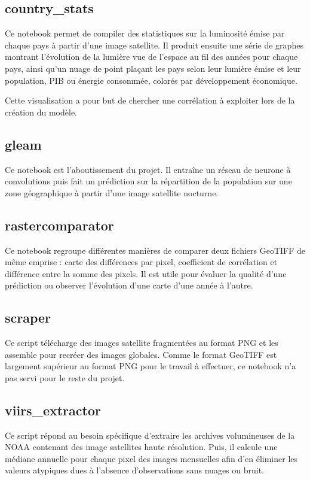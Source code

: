 \documentclass[a4paper, 11pt]{report}
\begin{document}
\subsection{country\_stats}
Ce notebook permet de compiler des statistiques sur la luminosité émise par chaque pays à partir d'une image satellite. Il produit ensuite une série de graphes montrant l'évolution de la lumière vue de l'espace au fil des années pour chaque pays, ainsi qu'un nuage de point plaçant les pays selon leur lumière émise et leur population, PIB ou énergie consommée, colorés par développement économique.

Cette visualisation a pour but de chercher une corrélation à exploiter lors de la création du modèle.

\subsection{gleam}
Ce notebook est l'aboutissement du projet. Il entraîne un réseau de neurone à convolutions puis fait un prédiction sur la répartition de la population sur une zone géographique à partir d'une image satellite nocturne.

\subsection{rastercomparator}
Ce notebook regroupe différentes manières de comparer deux fichiers GeoTIFF de même emprise : carte des différences par pixel, coefficient de corrélation et différence entre la somme des pixels. Il est utile pour évaluer la qualité d'une prédiction ou observer l'évolution d'une carte d'une année à l'autre.

\subsection{scraper}
Ce script télécharge des images satellite fragmentées au format PNG et les assemble pour recréer des images globales. Comme le format GeoTIFF est largement supérieur au format PNG pour le travail à effectuer, ce notebook n'a pas servi pour le reste du projet.

\subsection{viirs\_extractor}
Ce script répond au besoin spécifique d'extraire les archives volumineuses  de la NOAA \cite{noaa-viirs} contenant des image satellites haute résolution. Puis, il calcule une médiane annuelle pour chaque pixel des images mensuelles afin d'en éliminer les valeurs atypiques dues à l'absence d'observations sans nuages ou bruit.
\end{document}
